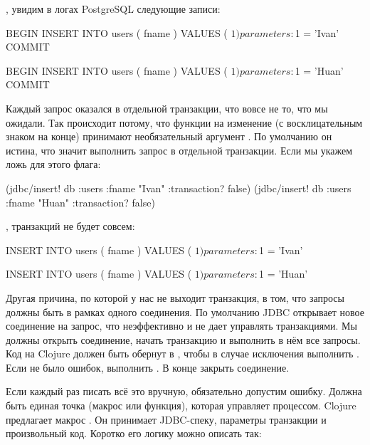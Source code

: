, увидим в логах PostgreSQL следующие записи:

\begin{english}
  \begin{sql}
BEGIN
INSERT INTO users ( fname ) VALUES ( $1 )
parameters: $1 = 'Ivan'
COMMIT

BEGIN
INSERT INTO users ( fname ) VALUES ( $1 )
parameters: $1 = 'Huan'
COMMIT
  \end{sql}
\end{english}

Каждый запрос оказался в отдельной транзакции, что вовсе не то, что мы ожидали. Так происходит потому, что функции на изменение (с восклицательным знаком на конце) принимают необязательный аргумент . По умолчанию он истина, что значит выполнить запрос в отдельной транзакции. Если мы укажем ложь для этого флага:

\begin{english}
  \begin{clojure}
(jdbc/insert! db :users {:fname "Ivan"} {:transaction? false})
(jdbc/insert! db :users {:fname "Huan"} {:transaction? false})
  \end{clojure}
\end{english}

, транзакций не будет совсем:

\begin{english}
  \begin{sql}
INSERT INTO users ( fname ) VALUES ( $1 )
parameters: $1 = 'Ivan'

INSERT INTO users ( fname ) VALUES ( $1 )
parameters: $1 = 'Huan'
  \end{sql}
\end{english}

Другая причина, по которой у нас не выходит транзакция, в том, что запросы должны быть в рамках одного соединения. По умолчанию JDBC открывает новое соединение на запрос, что неэффективно и не дает управлять транзакциями. Мы должны открыть соединение, начать транзакцию и выполнить в нём все запросы. Код на Clojure должен быть обернут в , чтобы в случае исключения выполнить . Если не было ошибок, выполнить . В конце закрыть соединение.

Если каждый раз писать всё это вручную, обязательно допустим ошибку. Должна быть единая точка (макрос или функция), которая управляет процессом. Clojure предлагает макрос . Он принимает JDBC-спеку, параметры транзакции и произвольный код. Коротко его логику можно описать так:

